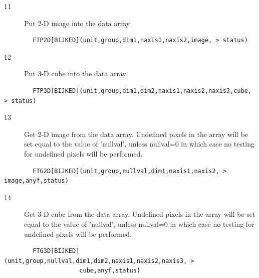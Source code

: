\documentclass[11pt]{book}
\begin{document}
\begin{description}
\item[11]  Put 2-D image into the data array
\end{description}

\begin{verbatim}
        FTP2D[BIJKED](unit,group,dim1,naxis1,naxis2,image, > status)
\end{verbatim}

\begin{description}
\item[12]  Put 3-D cube into the data array
\end{description}

\begin{verbatim}
        FTP3D[BIJKED](unit,group,dim1,dim2,naxis1,naxis2,naxis3,cube, > status)
\end{verbatim}

\begin{description}
\item[13]  Get 2-D image from the data array.  Undefined
     pixels in the array will be set equal to the value of 'nullval',
     unless nullval=0 in which case no testing for undefined pixels will
    be performed.
\end{description}

\begin{verbatim}
        FTG2D[BIJKED](unit,group,nullval,dim1,naxis1,naxis2, > image,anyf,status)
\end{verbatim}

\begin{description}
\item[14] Get 3-D cube from the data array.   Undefined
    pixels in the array will be set equal to the value of 'nullval',
    unless nullval=0 in which case no testing for undefined pixels will
   be performed.
\end{description}

\begin{verbatim}
        FTG3D[BIJKED](unit,group,nullval,dim1,dim2,naxis1,naxis2,naxis3, >
                     cube,anyf,status)
\end{verbatim}
\end{document}
